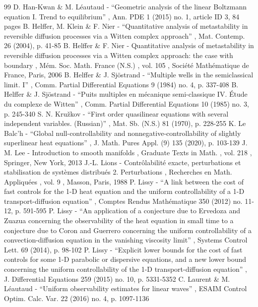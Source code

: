 \documentclass[11pt]{article}
\numberwithin{equation}{section}
\theoremstyle{definition}
\begin{document}
\begin{thebibliography}{99}
 D. Han-Kwan \& M. Léautaud - “Geometric analysis of the linear Boltzmann equation I. Trend to equilibrium” , Ann. PDE 1 (2015) no. 1, article ID 3, 84 pages
 B. Helffer, M. Klein \& F. Nier - “Quantitative analysis of metastability in reversible diffusion processes via a Witten complex approach” , Mat. Contemp. 26 (2004), p. 41-85
 B. Helffer \& F. Nier - Quantitative analysis of metastability in reversible diffusion processes via a Witten complex approach: the case with boundary , Mém. Soc. Math. France (N.S.) , vol. 105 , Société Mathématique de France, Paris, 2006
 B. Helffer \& J. Sjöstrand - “Multiple wells in the semiclassical limit. I” , Comm. Partial Differential Equations 9 (1984) no. 4, p. 337-408
 B. Helffer \& J. Sjöstrand - “Puits multiples en mécanique semi-classique IV. Étude du complexe de Witten” , Comm. Partial Differential Equations 10 (1985) no. 3, p. 245-340
 S. N. Kružkov - “First order quasilinear equations with several independent variables. (Russian)” , Mat. Sb. (N.S.) 81 (1970), p. 228-255
 K. Le Balc’h - “Global null-controllability and nonnegative-controllability of slightly superlinear heat equations” , J. Math. Pures Appl. (9) 135 (2020), p. 103-139
 J. M. Lee - Introduction to smooth manifolds , Graduate Texts in Math. , vol. 218 , Springer, New York, 2013
 J.-L. Lions - Contrôlabilité exacte, perturbations et stabilisation de systèmes distribués 2. Perturbations , Recherches en Math. Appliquées , vol. 9 , Masson, Paris, 1988
 P. Lissy - “A link between the cost of fast controls for the 1-D heat equation and the uniform controllability of a 1-D transport-diffusion equation” , Comptes Rendus Mathématique 350 (2012) no. 11-12, p. 591-595
 P. Lissy - “An application of a conjecture due to Ervedoza and Zuazua concerning the observability of the heat equation in small time to a conjecture due to Coron and Guerrero concerning the uniform controllability of a convection-diffusion equation in the vanishing viscosity limit” , Systems Control Lett. 69 (2014), p. 98-102
 P. Lissy - “Explicit lower bounds for the cost of fast controls for some 1-D parabolic or dispersive equations, and a new lower bound concerning the uniform controllability of the 1-D transport-diffusion equation” , J. Differential Equations 259 (2015) no. 10, p. 5331-5352
 C. Laurent \& M. Léautaud - “Uniform observability estimates for linear waves” , ESAIM Control Optim. Calc. Var. 22 (2016) no. 4, p. 1097-1136

\end{thebibliography}
\end{document}
